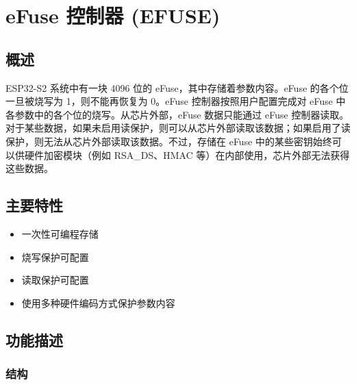 \documentclass[main\_\_CN.tex]{subfiles}
\begin{document}
\setchineseformatting

\ifglobal
\else
    \listoftodos
    {\let\clearpage\relax \listofdonetodos}
    \tableofcontents
\fi




\hypertarget{efuse}{}
\chapter{eFuse 控制器 (EFUSE)}
\label{mod:efuse}


\section{概述}

ESP32-S2 系统中有一块 4096 位的 eFuse，其中存储着参数内容。eFuse 的各个位 一旦被烧写为 1，则不能再恢复为 0。eFuse 控制器按照用户配置完成对 eFuse 中各参数中的各个位的烧写。从芯片外部，eFuse 数据只能通过 eFuse 控制器读取。对于某些数据，如果未启用读保护，则可以从芯片外部读取该数据；如果启用了读保护，则无法从芯片外部读取该数据。不过，存储在 eFuse 中的某些密钥始终可以供硬件加密模块（例如 RSA\_DS、HMAC 等）在内部使用，芯片外部无法获得这些数据。


\section{主要特性}

\begin{itemize}
\item 一次性可编程存储
    \item 烧写保护可配置
    \item 读取保护可配置
    \item 使用多种硬件编码方式保护参数内容
\end{itemize}


\section{功能描述}

\subsection{结构}
\end{document}
